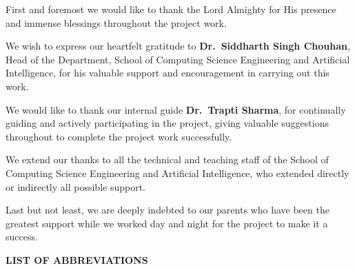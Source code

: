 \documentclass[12pt,a4paper]{report}
\begin{document}
First and foremost we would like to thank the Lord Almighty for His presence and
immense blessings throughout the project work.

We wish to express our heartfelt gratitude to \textbf{Dr.\ Siddharth Singh Chouhan},
Head of the Department, School of Computing Science Engineering and Artificial
Intelligence, for his valuable support and encouragement in carrying out this work.

We would like to thank our internal guide \textbf{Dr.\ Trapti Sharma}, for continually
guiding and actively participating in the project, giving valuable suggestions throughout
to complete the project work successfully.

We extend our thanks to all the technical and teaching staff of the School of Computing
Science Engineering and Artificial Intelligence, who extended directly or indirectly all
possible support.

Last but not least, we are deeply indebted to our parents who have been the greatest
support while we worked day and night for the project to make it a success.

\clearpage
\thispagestyle{plain}
\begin{center}
{\Large\bfseries LIST OF ABBREVIATIONS}
\end{center}
\vspace{0.4cm}
\end{document}
